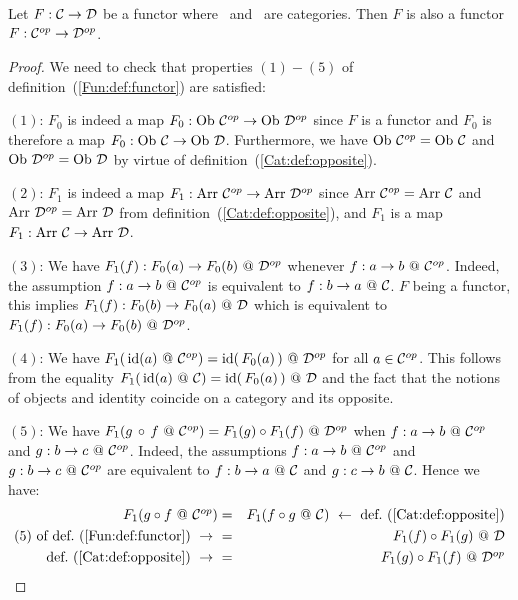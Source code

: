 \begin{prop}\label{Fun:prop:opposite}
    Let $F:\mbox{$\cal C$}\to\mbox{$\cal D$}$ be a functor where \Cat\ and \Dat\ are categories. Then
    $F$ is also a functor $F:\mbox{${\cal C}^{op}$}\to\mbox{${\cal D}^{op}$}$.
\end{prop}
\begin{proof}
    We need to check that properties $(1)-(5)$ of 
    definition~(\ref{Fun:def:functor}) are satisfied:

    $(1)$: $F_{0}$ is indeed a map $F_{0}:\ob\ \Cop\to\ob\ \Dop$ since $F$ is
    a functor and $F_{0}$ is therefore a map $F_{0}:\ob\ \Cat\to\ob\ \Dat$. 
    Furthermore, we have $\ob\ \Cop=\ob\ \Cat$ and $\ob\ \Dop=\ob\ \Dat$ by 
    virtue of definition~(\ref{Cat:def:opposite}).

    $(2)$: $F_{1}$ is indeed a map $F_{1}:\arr\ \Cop\to\arr\ \Dop$ since
    $\arr\ \Cop=\arr\ \Cat$ and $\arr\ \Dop=\arr\ \Dat$ from
    definition~(\ref{Cat:def:opposite}), and $F_{1}$ is a map
    $F_{1}:\arr\ \Cat\to\arr\ \Dat$.

    $(3)$: We have $F_{1}(f):F_{0}(a)\to F_{0}(b)\ @\ \Dop$ whenever
    $f:a\to b\ @\ \Cop$. Indeed, the assumption $f:a\to b\ @\ \Cop$ is equivalent
    to $f:b\to a\ @\ \Cat$. $F$ being a functor, this implies
    $F_{1}(f):F_{0}(b)\to F_{0}(a)\ @\ \mbox{$\cal D$}$ which is equivalent to 
    $F_{1}(f):F_{0}(a)\to F_{0}(b)\ @\ \Dop$.

    $(4)$: We have $F_{1}(\,\id(a)\ @\ \Cop)=\id(\,F_{0}(a)\,)\ @\ \Dop$ for
    all $a\in\mbox{${\cal C}^{op}$}$. This follows from the equality $F_{1}(\,\mbox{\rm id}(a)\ @\ \mbox{$\cal C$})
    =\mbox{\rm id}(\,F_{0}(a)\,)\ @\ \mbox{$\cal D$}$ and the fact that the notions of objects and
    identity coincide on a category and its opposite.

    $(5)$: We have $F_{1}(g\,\circ\,f\ @\ \Cop)=F_{1}(g)\circ F_{1}(f)\ @\ \Dop$
    when $f:a\to b\ @\ \Cop$ and $g:b\to c\ @\ \mbox{${\cal C}^{op}$}$. Indeed, the assumptions
    $f:a\to b\ @\ \Cop$ and $g:b\to c\ @\ \mbox{${\cal C}^{op}$}$ are equivalent to 
    $f:b\to a\ @\ \Cat$ and $g:c\to b\ @\ \mbox{$\cal C$}$. Hence we have:
        \begin{eqnarray*}F_{1}(g\circ f\ @\ \Cop)
            &=&F_{1}(f\circ g\ @\ \Cat)\ \leftarrow\ 
            \mbox{def.~(\ref{Cat:def:opposite})}\\
            \mbox{$(5)$ of def.~(\ref{Fun:def:functor})}\ \to\ 
            &=&F_{1}(f)\circ F_{1}(g)\ @\ \Dat\\
            \mbox{def.~(\ref{Cat:def:opposite})}\ \to\ 
            &=&F_{1}(g)\circ F_{1}(f)\ @\ \Dop
        \end{eqnarray*}
\end{proof}


